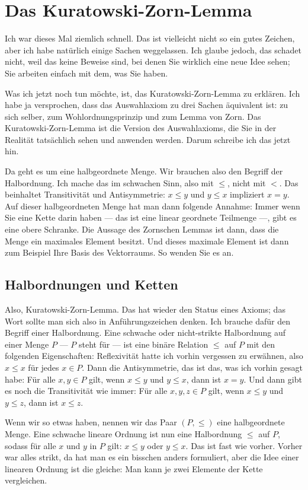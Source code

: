 \section{Das Kuratowski-Zorn-Lemma}

\begin{spoken-clean}[00:54:40 - 00:56:40]
Ich war dieses Mal ziemlich schnell. Das ist vielleicht nicht so ein gutes Zeichen, aber ich habe natürlich einige Sachen weggelassen. Ich glaube jedoch, das schadet nicht, weil das keine Beweise sind, bei denen Sie wirklich eine neue Idee sehen; Sie arbeiten einfach mit dem, was Sie haben. 

Was ich jetzt noch tun möchte, ist, das Kuratowski-Zorn-Lemma zu erklären. Ich habe ja versprochen, dass das Auswahlaxiom zu drei Sachen äquivalent ist: zu sich selber, zum Wohlordnungsprinzip und zum Lemma von Zorn. Das Kuratowski-Zorn-Lemma ist die Version des Auswahlaxioms, die Sie in der Realität tatsächlich sehen und anwenden werden. Darum schreibe ich das jetzt hin.

Da geht es um eine halbgeordnete Menge. Wir brauchen also den Begriff der Halbordnung. Ich mache das im schwachen Sinn, also mit $\le$, nicht mit $<$. Das beinhaltet Transitivität und Antisymmetrie: $x \le y$ und $y \le x$ impliziert $x = y$. Auf dieser halbgeordneten Menge hat man dann folgende Annahme: Immer wenn Sie eine Kette darin haben --- das ist eine linear geordnete Teilmenge ---, gibt es eine obere Schranke. Die Aussage des Zornschen Lemmas ist dann, dass die Menge ein maximales Element besitzt. Und dieses maximale Element ist dann zum Beispiel Ihre Basis des Vektorraums. So wenden Sie es an.
\end{spoken-clean}

\subsection{Halbordnungen und Ketten}

\begin{spoken-clean}[00:56:40 - 00:58:40]
Also, Kuratowski-Zorn-Lemma. Das hat wieder den Status eines Axioms; das Wort  sollte man sich also in Anführungszeichen denken. Ich brauche dafür den Begriff einer Halbordnung. Eine schwache oder nicht-strikte Halbordnung auf einer Menge $P$ --- $P$ steht für  --- ist eine binäre Relation $\le$ auf $P$ mit den folgenden Eigenschaften: Reflexivität hatte ich vorhin vergessen zu erwähnen, also $x \le x$ für jedes $x \in P$. Dann die Antisymmetrie, das ist das, was ich vorhin gesagt habe: Für alle $x, y \in P$ gilt, wenn $x \le y$ und $y \le x$, dann ist $x = y$. Und dann gibt es noch die Transitivität wie immer: Für alle $x, y, z \in P$ gilt, wenn $x \le y$ und $y \le z$, dann ist $x \le z$.

Wenn wir so etwas haben, nennen wir das Paar $(P, \le)$ eine halbgeordnete Menge. Eine schwache lineare Ordnung ist nun eine Halbordnung $\le$ auf $P$, sodass für alle $x$ und $y$ in $P$ gilt: $x \le y$ oder $y \le x$. Das ist fast wie vorher. Vorher war alles strikt, da hat man es ein bisschen anders formuliert, aber die Idee einer linearen Ordnung ist die gleiche: Man kann je zwei Elemente der Kette vergleichen.
\end{spoken-clean}

